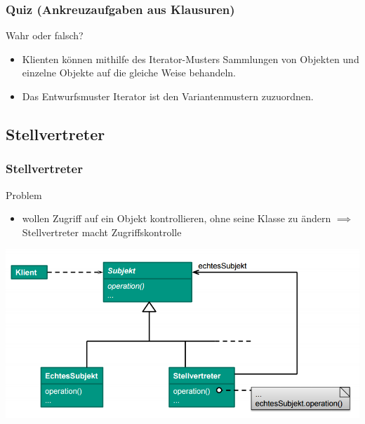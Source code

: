 \documentclass[18pt]{beamer}
\newcommand{\xmark}{\ding{55}}%
\newcommand{\ncorrect}{\textcolor{red}{\xmark}}
\begin{document}
	\begin{frame}
		\frametitle{Quiz (Ankreuzaufgaben aus Klausuren)}
		Wahr oder falsch?
		\begin{itemize}
			\item Klienten können mithilfe des Iterator-Musters Sammlungen von Objekten und einzelne Objekte auf die gleiche Weise behandeln. \pause \ncorrect \pause
			\item Das Entwurfsmuster Iterator ist den Variantenmustern zuzuordnen. \pause \ncorrect
		\end{itemize}
	\end{frame}

	\subsection{Stellvertreter}
	\begin{frame}
		\frametitle{Stellvertreter}
		\begin{block}{Problem}
			\begin{itemize}
				\item wollen Zugriff auf ein Objekt kontrollieren, ohne seine Klasse zu ändern \linebreak \pause $\implies$ Stellvertreter macht Zugriffskontrolle
			\end{itemize}
		\end{block}
		\pause
		\centering
		\includegraphics[scale=0.4]{./pics/tut3/prox.png}
	\end{frame}
\end{document}

